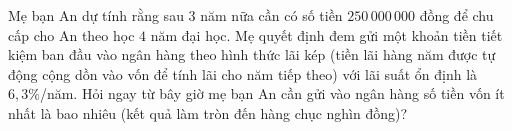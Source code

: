 \begin{bt}%
Mẹ bạn An dự tính rằng sau $3$ năm nữa cần có số tiền $250\,000\,000$ đồng để chu cấp cho An theo học $4$ năm đại học. Mẹ quyết định đem gửi một khoản tiền tiết kiệm ban đầu vào ngân hàng theo hình thức lãi kép (tiền lãi hàng năm được tự động cộng dồn vào vốn để tính lãi cho năm tiếp theo) với lãi suất ổn định là $6{,}3\%$/năm. Hỏi ngay từ bây giờ mẹ bạn An cần gửi vào ngân hàng số tiền vốn ít nhất là bao nhiêu (kết quả làm tròn đến hàng chục nghìn đồng)?
\end{bt}

